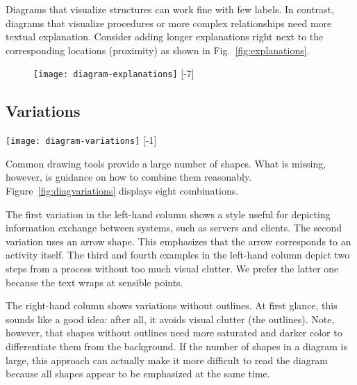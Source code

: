 Diagrams that visualize structures can work fine with few labels. In contrast, diagrams that visualize procedures or more complex relationships need more textual explanation. Consider adding longer explanations right next to the corresponding locations (proximity) as shown in Fig.~\ref{fig:explanations}.

\begin{figure}[t]
\centering
\texttt{[image: diagram-explanations]} 
[-7\baselineskip]
\end{figure}


\subsection{Variations}

\begin{figure*}[t]
\centering
\texttt{[image: diagram-variations]}
[-1\baselineskip]
\end{figure*}

Common drawing tools provide a large number of shapes. What is missing, however, is guidance on how to combine them reasonably. Figure~\ref{fig:diagvariations} displays eight combinations.

The first variation in the left-hand column shows a style useful for depicting information exchange between systems, such as servers and clients. The second variation uses an arrow shape. This emphasizes that the arrow corresponds to an activity itself. The third and fourth examples in the left-hand column depict two steps from a process without too much visual clutter. We prefer the latter one because the text wraps at sensible points.

The right-hand column shows variations without outlines. At first glance, this sounds like a good  idea: after all, it avoids visual clutter (the outlines). Note, however, that shapes without outlines need more saturated and darker color to differentiate them from the background.  If the number of shapes in a diagram is large, this approach can actually make it more difficult to read the diagram because all shapes appear to be emphasized at the same time.

